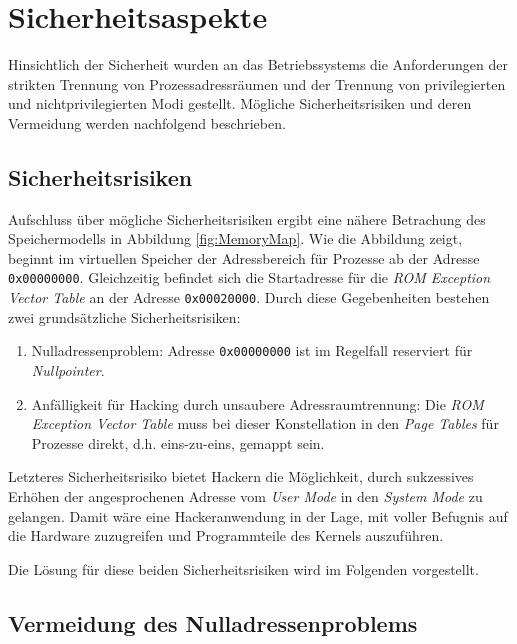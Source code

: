 \section{Sicherheitsaspekte}
\label{chapSecurity}

Hinsichtlich der Sicherheit wurden an das Betriebssystems die Anforderungen der strikten Trennung von Prozessadressräumen und der Trennung von privilegierten und nichtprivilegierten Modi gestellt. Mögliche Sicherheitsrisiken und deren Vermeidung werden nachfolgend beschrieben.

\subsection{Sicherheitsrisiken}

Aufschluss über mögliche Sicherheitsrisiken ergibt eine nähere Betrachung des Speichermodells in Abbildung \ref{fig:MemoryMap}. Wie die Abbildung zeigt, beginnt im virtuellen Speicher der Adressbereich für Prozesse ab der Adresse \texttt{0x00000000}. Gleichzeitig befindet sich die Startadresse für die \textit{ROM Exception Vector Table} an der Adresse \texttt{0x00020000}. Durch diese Gegebenheiten bestehen zwei grundsätzliche Sicherheitsrisiken:

\begin{enumerate}
	\item Nulladressenproblem: Adresse \texttt{0x00000000} ist im Regelfall reserviert für \textit{Nullpointer}.
	\item Anfälligkeit für Hacking durch unsaubere Adressraumtrennung: Die \textit{ROM Exception Vector Table} muss bei dieser Konstellation in den \textit{Page Tables} für Prozesse direkt, d.h. eins-zu-eins, gemappt sein.
\end{enumerate}

Letzteres Sicherheitsrisiko bietet Hackern die Möglichkeit, durch sukzessives Erhöhen der angesprochenen Adresse vom \textit{User Mode} in den \textit{System Mode} zu gelangen. Damit wäre eine Hackeranwendung in der Lage, mit voller Befugnis auf die Hardware zuzugreifen und Programmteile des Kernels auszuführen.

Die Lösung für diese beiden Sicherheitsrisiken wird im Folgenden vorgestellt.

\subsection{Vermeidung des Nulladressenproblems}

